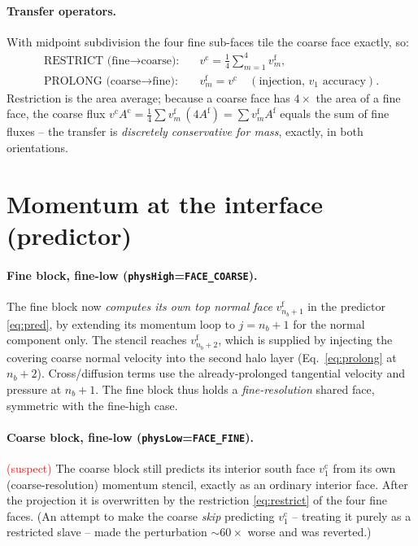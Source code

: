 \documentclass[11pt]{article}
\newcommand{\fine}{\mathrm{f}}
\newcommand{\coarse}{\mathrm{c}}
\begin{document}
\paragraph{Transfer operators.} With midpoint subdivision the four fine
sub-faces tile the coarse face exactly, so:
\begin{align}
  \text{RESTRICT (fine$\to$coarse):}\quad & v^\coarse=\tfrac14\textstyle\sum_{m=1}^{4} v^\fine_m, \label{eq:restrict}\\
  \text{PROLONG (coarse$\to$fine):}\quad & v^\fine_m=v^\coarse \quad(\text{injection, $v_1$ accuracy}). \label{eq:prolong}
\end{align}
Restriction is the area average; because a coarse face has $4\times$ the area
of a fine face, the coarse flux $v^\coarse A^\coarse=\tfrac14\sum v^\fine_m\,(4A^\fine)=\sum v^\fine_m A^\fine$
equals the sum of fine fluxes -- the transfer is \emph{discretely
conservative for mass}, exactly, in both orientations.

\section{Momentum at the interface (predictor)}

\paragraph{Fine block, fine-low (\texttt{physHigh}=\texttt{FACE\_COARSE}).}
The fine block now \emph{computes its own top normal face} $v^\fine_{n_b+1}$
in the predictor \eqref{eq:pred}, by extending its momentum loop to $j=n_b{+}1$
for the normal component only. The stencil reaches $v^\fine_{n_b+2}$, which is
supplied by injecting the covering coarse normal velocity into the second
halo layer (Eq.~\ref{eq:prolong} at $n_b{+}2$). Cross/diffusion terms use the
already-prolonged tangential velocity and pressure at $n_b{+}1$. The fine
block thus holds a \emph{fine-resolution} shared face, symmetric with the
fine-high case.

\paragraph{Coarse block, fine-low (\texttt{physLow}=\texttt{FACE\_FINE}).}
\textcolor{red}{(suspect)} The coarse block still predicts its interior south
face $v^\coarse_1$ from its own (coarse-resolution) momentum stencil, exactly
as an ordinary interior face. After the projection it is overwritten by the
restriction \eqref{eq:restrict} of the four fine faces. (An attempt to make
the coarse \emph{skip} predicting $v^\coarse_1$ -- treating it purely as a
restricted slave -- made the perturbation $\sim\!60\times$ worse and was
reverted.)
\end{document}
